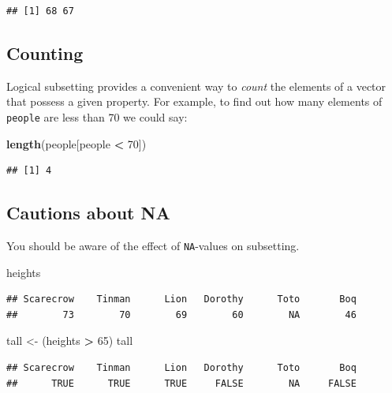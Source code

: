 \documentclass[]{book}
\makeatletter
\newenvironment{Shaded}{\begin{snugshade}}{\end{snugshade}}
\newcommand{\KeywordTok}[1]{\textcolor[rgb]{0.13,0.29,0.53}{\textbf{#1}}}
\newcommand{\DecValTok}[1]{\textcolor[rgb]{0.00,0.00,0.81}{#1}}
\newcommand{\StringTok}[1]{\textcolor[rgb]{0.31,0.60,0.02}{#1}}
\newcommand{\OperatorTok}[1]{\textcolor[rgb]{0.81,0.36,0.00}{\textbf{#1}}}
\newcommand{\NormalTok}[1]{#1}
\newenvironment{kframe}{%
\medskip{}
\setlength{\fboxsep}{.8em}
 \def\at@end@of@kframe{}%
 \ifinner\ifhmode%
  \def\at@end@of@kframe{\end{minipage}}%
  \begin{minipage}{\columnwidth}%
 \fi\fi%
 \def\FrameCommand##1{\hskip\@totalleftmargin \hskip-\fboxsep
 \colorbox{shadecolor}{##1}\hskip-\fboxsep
     \hskip-\linewidth \hskip-\@totalleftmargin \hskip\columnwidth}%
 \MakeFramed {\advance\hsize-\width
   \@totalleftmargin\z@ \linewidth\hsize
   \@setminipage}}%
 {\par\unskip\endMakeFramed%
 \at@end@of@kframe}
\renewenvironment{Shaded}{\begin{kframe}}{\end{kframe}}
\theoremstyle{definition}
\theoremstyle{definition}
\theoremstyle{definition}
\theoremstyle{remark}
\makeatother
\begin{document}
\begin{verbatim}
## [1] 68 67
\end{verbatim}

\subsection{Counting}\label{counting}

Logical subsetting provides a convenient way to \emph{count} the
elements of a vector that possess a given property. For example, to find
out how many elements of \texttt{people} are less than 70 we could say:

\begin{Shaded}
\begin{Highlighting}[]
\KeywordTok{length}\NormalTok{(people[people }\OperatorTok{<}\StringTok{ }\DecValTok{70}\NormalTok{])}
\end{Highlighting}
\end{Shaded}

\begin{verbatim}
## [1] 4
\end{verbatim}

\subsection{Cautions about NA}\label{cautions-about-na}

You should be aware of the effect of \texttt{NA}-values on subsetting.

\begin{Shaded}
\begin{Highlighting}[]
\NormalTok{heights}
\end{Highlighting}
\end{Shaded}

\begin{verbatim}
## Scarecrow    Tinman      Lion   Dorothy      Toto       Boq 
##        73        70        69        60        NA        46
\end{verbatim}

\begin{Shaded}
\begin{Highlighting}[]
\NormalTok{tall <-}\StringTok{ }\NormalTok{(heights }\OperatorTok{>}\StringTok{ }\DecValTok{65}\NormalTok{)}
\NormalTok{tall}
\end{Highlighting}
\end{Shaded}

\begin{verbatim}
## Scarecrow    Tinman      Lion   Dorothy      Toto       Boq 
##      TRUE      TRUE      TRUE     FALSE        NA     FALSE
\end{verbatim}
\end{document}

